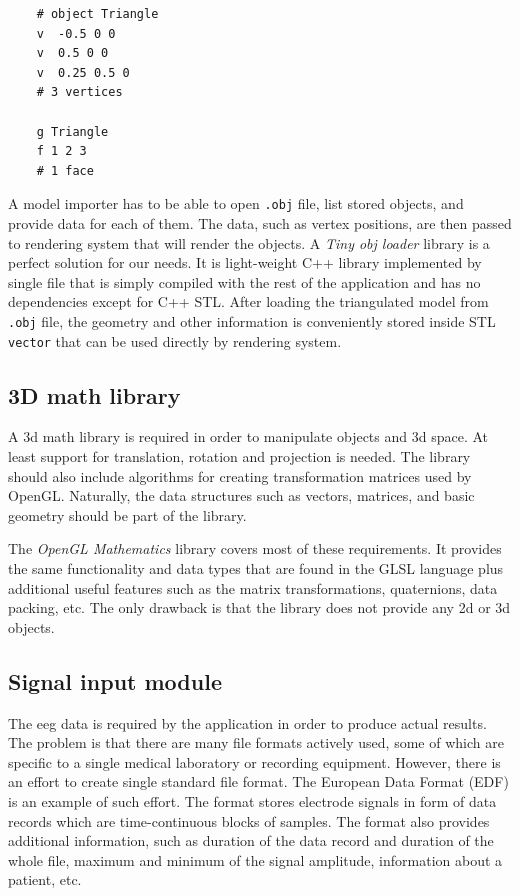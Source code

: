 \lstset{captionpos=b, caption=The .obj file example, label=lst:ObjFile}
\begin{lstlisting}
	# object Triangle
	v  -0.5 0 0
	v  0.5 0 0
	v  0.25 0.5 0
	# 3 vertices
	
	g Triangle
	f 1 2 3 
	# 1 face
\end{lstlisting}

A model importer has to be able to open \texttt{.obj} file, list stored objects, and provide data for each of them. The data, such as vertex positions, are then passed to rendering system that will render the objects. A \emph{Tiny obj loader} library is a perfect solution for our needs. It is light-weight C++ library implemented by single file that is simply compiled with the rest of the application and has no dependencies except for C++ STL. After loading the triangulated model from \texttt{.obj} file, the geometry and other information is conveniently stored inside STL \texttt{vector} that can be used directly by rendering system.

\subsection{3D math library}
A \gls{3d} math library is required in order to manipulate objects and \gls{3d} space. At least support for translation, rotation and projection is needed. The library should also include algorithms for creating transformation matrices used by OpenGL. Naturally, the data structures such as vectors, matrices, and basic geometry should be part of the library.

The \emph{OpenGL Mathematics} library covers most of these requirements. It provides the same functionality and data types that are found in the GLSL language plus additional useful features such as the matrix transformations, quaternions, data packing, etc. The only drawback is that the library does not provide any \gls{2d} or \gls{3d} objects.

\subsection{Signal input module}
The \gls{eeg} data is required by the application in order to produce actual results. The problem is that there are many file formats actively used, some of which are specific to a single medical laboratory or recording equipment. However, there is an effort to create single standard file format. The European Data Format (EDF) is an example of such effort. The format stores electrode signals in form of data records which are time-continuous blocks of samples. The format also provides additional information, such as duration of the data record and duration of the whole file, maximum and minimum of the signal amplitude, information about a patient, etc. 

